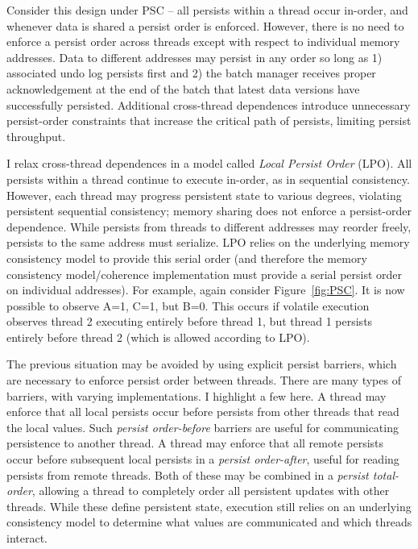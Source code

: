 Consider this design under PSC -- all persists within a thread occur in-order, and whenever data is shared a persist order is enforced.
However, there is no need to enforce a persist order across threads except with respect to individual memory addresses.
Data to different addresses may persist in any order so long as 1) associated undo log persists first and 2) the batch manager receives proper acknowledgement at the end of the batch that latest data versions have successfully persisted.
Additional cross-thread dependences introduce unnecessary persist-order constraints that increase the critical path of persists, limiting persist throughput.

I relax cross-thread dependences in a model called \emph{Local Persist Order} (LPO).
All persists within a thread continue to execute in-order, as in sequential consistency.
However, each thread may progress persistent state to various degrees, violating persistent sequential consistency; memory sharing does not enforce a persist-order dependence.
While persists from threads to different addresses may reorder freely, persists to the same address must serialize.
LPO relies on the underlying memory consistency model to provide this serial order (and therefore the memory consistency model/coherence implementation must provide a serial persist order on individual addresses).
For example, again consider Figure~\ref{fig:PSC}.
It is now possible to observe A=1, C=1, but B=0.
This occurs if volatile execution observes thread 2 executing entirely before thread 1, but thread 1 persists entirely before thread 2 (which is allowed according to LPO).

The previous situation may be avoided by using explicit persist barriers, which are necessary to enforce persist order between threads.
There are many types of barriers, with varying implementations.
I highlight a few here.
A thread may enforce that all local persists occur before persists from other threads that read the local values.
Such \emph{persist order-before} barriers are useful for communicating persistence to another thread.
A thread may enforce that all remote persists occur before subsequent local persists in a \emph{persist order-after}, useful for reading persists from remote threads.
Both of these may be combined in a \emph{persist total-order}, allowing a thread to completely order all persistent updates with other threads.
While these define persistent state, execution still relies on an underlying consistency model to determine what values are communicated and which threads interact.

